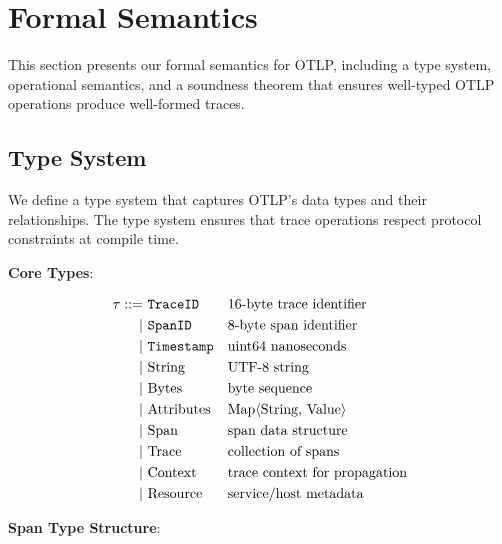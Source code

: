 
\section{Formal Semantics}
\label{sec:formal-semantics}

This section presents our formal semantics for OTLP, including a type system, operational semantics, and a soundness theorem that ensures well-typed OTLP operations produce well-formed traces.

\subsection{Type System}
\label{sec:type-system}

We define a type system that captures OTLP's data types and their relationships. The type system ensures that trace operations respect protocol constraints at compile time.

\textbf{Core Types}:

\begin{align*}
\tau ::= &\ \texttt{TraceID}           && \text{16-byte trace identifier} \\
        |&\ \texttt{SpanID}            && \text{8-byte span identifier} \\
        |&\ \texttt{Timestamp}         && \text{uint64 nanoseconds} \\
        |&\ \text{String}      && \text{UTF-8 string} \\
        |&\ \text{Bytes}       && \text{byte sequence} \\
        |&\ \text{Attributes}  && \text{Map⟨String, Value⟩} \\
        |&\ \text{Span}        && \text{span data structure} \\
        |&\ \text{Trace}       && \text{collection of spans} \\
        |&\ \text{Context}     && \text{trace context for propagation} \\
        |&\ \text{Resource}    && \text{service/host metadata}
\end{align*}

\textbf{Span Type Structure}:

